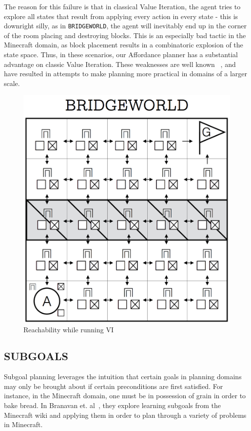 \documentclass[]{article}
\begin{document}
The reason for this failure is that in classical Value Iteration, the agent tries to explore all states that result from applying every action in every state - this is downright silly, as in \texttt{BRIDGEWORLD}, the agent will inevitably end up in the corner of the room placing and destroying blocks. This is an especially bad tactic in the Minecraft domain, as block placement results in a combinatoric explosion of the state space. Thus, in these scenarios, our Affordance planner has a substantial advantage on classic Value Iteration. These weaknesses are well known ~\citep{grounds}, and have resulted in attempts to make planning more practical in domains of a larger scale.


\begin{figure}
\centering
\includegraphics[scale = 0.2]{figures/bridgeworld_vi.png}
\caption{Reachability while running VI}
\end{figure}

\subsection{SUBGOALS}
Subgoal planning leverages the intuition that certain goals in planning domains may only be brought about if certain preconditions are first satisfied. For instance, in the Minecraft domain, one must be in possession of grain in order to bake bread. In Branavan et. al~\citep{branavan}, they explore learning subgoals from the Minecraft wiki and applying them in order to plan through a variety of problems in Minecraft.
\end{document}
